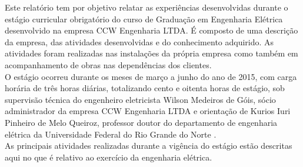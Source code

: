 
Este relatório tem por objetivo relatar as experiências desenvolvidas durante o estágio curricular obrigatório do curso de Graduação em  Engenharia 	
	Elétrica desenvolvido na empresa CCW Engenharia LTDA. É composto de uma descrição da empresa, das atividades desenvolvidas e do conhecimento adquirido. As atividades 
	foram realizadas nas instalações da própria empresa como também em acompanhamento 
	de obras nas dependências dos clientes.
	\\
	
	
	O estágio ocorreu durante os meses de março a junho do ano de 2015, com carga 
	horária de três horas diárias, totalizando cento e oitenta horas de estágio, 
	sob 
	supervisão técnica do engenheiro eletricista Wilson Medeiros de Góis, sócio 	
	administrador da empresa CCW Engenharia LTDA e orientação de Kurios Iuri Pinheiro de Melo Queiroz, professor doutor do departamento de engenharia elétrica da Universidade
	Federal do Rio Grande do Norte .
\\
	
	As principais atividades realizadas durante a vigência do estágio estão 
	descritas aqui no que é relativo ao exercício da engenharia elétrica.
